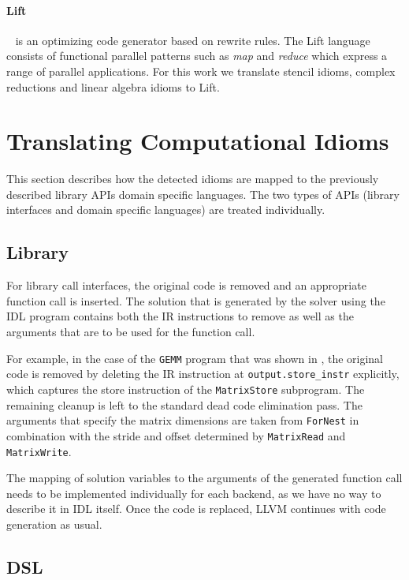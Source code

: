     \paragraph*{Lift}~\cite{steuwer15rewrite, SteuwerRD17, HagedornSSGD18} is an
    optimizing code generator based on rewrite rules.
    The Lift language consists of functional parallel patterns such as
    \emph{map} and \emph{reduce} which  express a range of parallel
    applications.
    For this work we translate stencil idioms, complex reductions and linear
    algebra idioms to Lift.

\section{Translating Computational Idioms}

    This section describes how the detected idioms are mapped to the previously
    described library APIs domain specific languages.
    The two types of APIs (library interfaces and domain specific languages) are
    treated individually.

\subsection{Library}

    For library call interfaces, the original code is removed and an appropriate
    function call is inserted.
    The solution that is generated by the solver using the IDL program contains
    both the IR instructions to remove as well as the arguments that are to be
    used for the function call.

    For example, in the case of the {\tt GEMM} program that was shown in
    , the original code is removed by deleting the IR
    instruction at {\tt output.store\_instr} explicitly, which captures the
    store instruction of the {\tt MatrixStore} subprogram.
    The remaining cleanup is left to the standard dead code elimination pass.
    The arguments that specify the matrix dimensions are taken from
    {\tt ForNest} in combination with the stride and offset determined by
    {\tt MatrixRead} and {\tt MatrixWrite}.

    The mapping of solution variables to the arguments of the generated function
    call needs to be implemented individually for each backend, as we have no
    way to describe it in IDL itself.
    Once the code is replaced, LLVM continues with code generation as usual.

\subsection{DSL}

